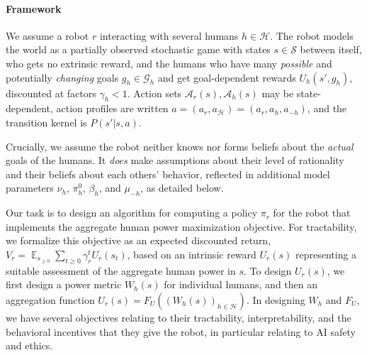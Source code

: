 \documentclass[letterpaper]{article} %
\DeclareMathOperator*{\E}{\mathbb{E}}
\def\A{\mathcal{A}}
\def\G{\mathcal{G}}
\def\H{\mathcal{H}}
\def\S{\mathcal{S}}
\begin{document}
\paragraph{Framework}
We assume a robot $r$ interacting with several humans $h\in\H$. 
The robot models the world as a partially observed stochastic game with states $s\in\S$ between itself, who gets no extrinsic reward, and the humans who have many {\em possible} and potentially {\em changing} goals $g_h\in\G_h$ and get goal-dependent rewards $U_h(s',g_h)$, discounted at factors $\gamma_h<1$. Action sets $\A_r(s),\A_h(s)$ may be state-dependent, action profiles are written $a=(a_r,a_\H)=(a_r,a_h,a_{-h})$, and the transition kernel is $P(s'|s,a)$. 

Crucially, we assume the robot neither knows nor forms beliefs about the {\em actual} goals of the humans. 
It {\em does} make assumptions about their level of rationality and their beliefs about each others' behavior, reflected in additional model parameters $\nu_h$, $\pi^0_h$, $\beta_h$, and $\mu_{-h}$, as detailed below.

Our task is to design an algorithm for computing a policy $\pi_r$ for the robot that implements the aggregate human power maximization objective. 
For tractability, we formalize this objective as an expected discounted return, $V_r = \E_{s_{\ge 0}}\sum_{t\ge 0}\gamma_r^t U_r(s_t)$, based on an intrinsic reward $U_r(s)$ representing a suitable assessment of the aggregate human power in $s$.
To design $U_r(s)$, we first design a power metric $W_h(s)$ for individual humans, and then an aggregation function $U_r(s) = F_U((W_h(s))_{h\in\H})$. 
In designing $W_h$ and $F_U$, we have several objectives relating to their tractability, interpretability, and the behavioral incentives that they give the robot, in particular relating to AI safety and ethics. 
\end{document}
